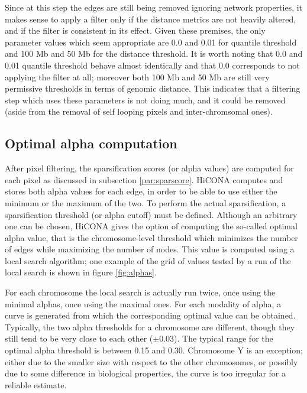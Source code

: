 Since at this step the edges are still being removed ignoring network properties, it makes sense to apply a filter only if the distance metrics are not heavily altered, and if the filter is consistent in its effect. Given these premises, the only parameter values which seem appropriate are 0.0 and 0.01 for quantile threshold and 100 Mb and 50 Mb for the distance threshold. It is worth noting that 0.0 and 0.01 quantile threshold behave almost identically and that 0.0 corresponds to not applying the filter at all; moreover both 100 Mb and 50 Mb are still very permissive thresholds in terms of genomic distance. This indicates that a filtering step which uses these parameters is not doing much, and it could be removed (aside from the removal of self looping pixels and inter-chromsomal ones).

\newpage
\subsection{Optimal alpha computation}

After pixel filtering, the sparsification scores (or alpha values) are computed for each pixel as discussed in subsection \ref{par:sparscore}. HiCONA computes and stores both alpha values for each edge, in order to be able to use either the minimum or the maximum of the two. To perform the actual sparsification, a sparsification threshold (or alpha cutoff) must be defined. Although an arbitrary one can be chosen, HiCONA gives the option of computing the so-called optimal alpha value, that is the chromosome-level threshold which minimizes the number of edges while maximizing the number of nodes. This value is computed using a local search algorithm; one example of the grid of values tested by a run of the local search is shown in figure \ref{fig:alphas}.

For each chromosome the local search is actually run twice, once using the minimal alphas, once using the maximal ones. For each modality of alpha, a curve is generated from which the corresponding optimal value can be obtained. Typically, the two alpha thresholds for a chromosome are different, though they still tend to be very close to each other ($\pm 0.03$). The typical range for the optimal alpha threshold is between 0.15 and 0.30. Chromosome Y is an exception; either due to the smaller size with respect to the other chromosomes, or possibly due to some difference in biological properties, the curve is too irregular for a reliable estimate. 

